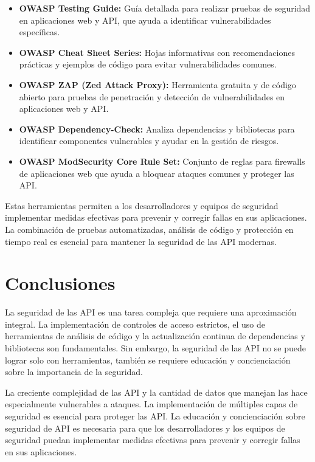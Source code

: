 \documentclass[a4paper,12pt]{article}
\begin{document}
\begin{itemize}
    \item \textbf{OWASP Testing Guide:} Guía detallada para realizar pruebas de seguridad en aplicaciones web y API, que ayuda a identificar vulnerabilidades específicas.
    \item \textbf{OWASP Cheat Sheet Series:} Hojas informativas con recomendaciones prácticas y ejemplos de código para evitar vulnerabilidades comunes.
    \item \textbf{OWASP ZAP (Zed Attack Proxy):} Herramienta gratuita y de código abierto para pruebas de penetración y detección de vulnerabilidades en aplicaciones web y API.
    \item \textbf{OWASP Dependency-Check:} Analiza dependencias y bibliotecas para identificar componentes vulnerables y ayudar en la gestión de riesgos.
    \item \textbf{OWASP ModSecurity Core Rule Set:} Conjunto de reglas para firewalls de aplicaciones web que ayuda a bloquear ataques comunes y proteger las API.
\end{itemize}

Estas herramientas permiten a los desarrolladores y equipos de seguridad implementar medidas efectivas para prevenir y corregir fallas en sus aplicaciones. La combinación de pruebas automatizadas, análisis de código y protección en tiempo real es esencial para mantener la seguridad de las API modernas.

\section{Conclusiones}

La seguridad de las API es una tarea compleja que requiere una aproximación integral. La implementación de controles de acceso estrictos, el uso de herramientas de análisis de código y la actualización continua de dependencias y bibliotecas son fundamentales. Sin embargo, la seguridad de las API no se puede lograr solo con herramientas, también se requiere educación y concienciación sobre la importancia de la seguridad.

La creciente complejidad de las API y la cantidad de datos que manejan las hace especialmente vulnerables a ataques. La implementación de múltiples capas de seguridad es esencial para proteger las API. La educación y concienciación sobre seguridad de API es necesaria para que los desarrolladores y los equipos de seguridad puedan implementar medidas efectivas para prevenir y corregir fallas en sus aplicaciones.
\end{document}
